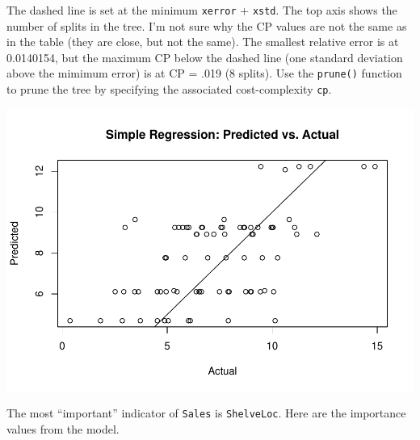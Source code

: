 \documentclass[
]{book}
\newenvironment{Shaded}{\begin{snugshade}}{\end{snugshade}}
\newcommand{\DataTypeTok}[1]{\textcolor[rgb]{0.13,0.29,0.53}{#1}}
\newcommand{\DecValTok}[1]{\textcolor[rgb]{0.00,0.00,0.81}{#1}}
\newcommand{\KeywordTok}[1]{\textcolor[rgb]{0.13,0.29,0.53}{\textbf{#1}}}
\newcommand{\NormalTok}[1]{#1}
\newcommand{\OperatorTok}[1]{\textcolor[rgb]{0.81,0.36,0.00}{\textbf{#1}}}
\newcommand{\OtherTok}[1]{\textcolor[rgb]{0.56,0.35,0.01}{#1}}
\newcommand{\StringTok}[1]{\textcolor[rgb]{0.31,0.60,0.02}{#1}}
\begin{document}
The dashed line is set at the minimum \texttt{xerror} + \texttt{xstd}. The top axis shows the number of splits in the tree. I'm not sure why the CP values are not the same as in the table (they are close, but not the same). The smallest relative error is at 0.0140154, but the maximum CP below the dashed line (one standard deviation above the mimimum error) is at CP = .019 (8 splits). Use the \texttt{prune()} function to prune the tree by specifying the associated cost-complexity \texttt{cp}.

\begin{Shaded}
\end{Shaded}

\includegraphics{data-sci_files/figure-latex/unnamed-chunk-70-1.pdf}

The most ``important'' indicator of \texttt{Sales} is \texttt{ShelveLoc}. Here are the importance values from the model.
\end{document}
